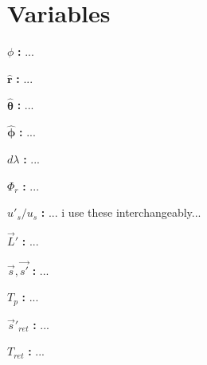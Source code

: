 \section{Variables}

\noindent ${\phi}$ \textbf{:}
...

\noindent $\mathbf{\hat{\text{$r$}}}$ \textbf{:}
...

\noindent $\mathbf{\hat{\text{$\theta$}}}$ \textbf{:}
...

\noindent $\mathbf{\hat{\text{$\phi$}}}$ \textbf{:}
...

\noindent ${d\lambda}$ \textbf{:}
...

\noindent ${\Phi_r}$ \textbf{:}
...

\noindent ${u'_s}/u_s$ \textbf{:}
... i use these interchangeably...

\noindent ${\vec{L}'}$ \textbf{:}
...

\noindent ${\vec{s}},{\vec{s'}}$ \textbf{:}
...

\noindent ${T_p}$ \textbf{:}
...

\noindent ${\vec{s}'_{ret}}$ \textbf{:}
...

\noindent ${T_{ret}}$ \textbf{:}
...
